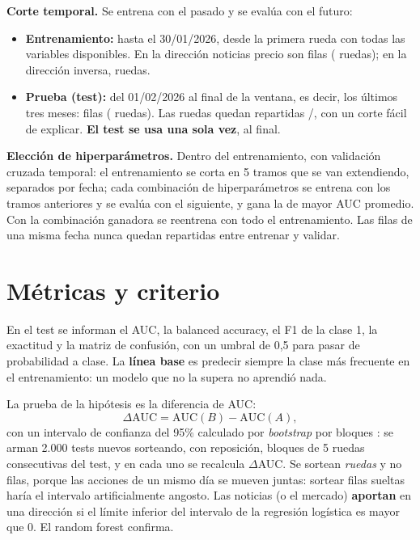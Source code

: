 \textbf{Corte temporal.} Se entrena con el pasado y se evalúa con el futuro:
\begin{itemize}
  \item \textbf{Entrenamiento:} hasta el 30/01/2026, desde la primera rueda con todas las
        variables disponibles. En la dirección noticias \flecha{} precio son
         filas ( ruedas); en la
        dirección inversa,  ruedas.
  \item \textbf{Prueba (test):} del 01/02/2026 al final de la ventana, es decir, los últimos tres
        meses:  filas ( ruedas). Las ruedas quedan
        repartidas /, con un corte
        fácil de explicar. \textbf{El test se usa una sola vez}, al final.
\end{itemize}

\textbf{Elección de hiperparámetros.} Dentro del entrenamiento, con validación cruzada temporal: el
entrenamiento se corta en 5 tramos que se van extendiendo, separados por fecha; cada combinación de
hiperparámetros se entrena con los tramos anteriores y se evalúa con el siguiente, y gana la de mayor
AUC promedio. Con la combinación ganadora se reentrena con todo el entrenamiento. Las filas de una
misma fecha nunca quedan repartidas entre entrenar y validar.

\section{Métricas y criterio}
\label{sec:criterio}

En el test se informan el AUC, la balanced accuracy, el F1 de la clase 1, la exactitud y la matriz
de confusión, con un umbral de 0,5 para pasar de probabilidad a clase. La \textbf{línea base} es
predecir siempre la clase más frecuente en el entrenamiento: un modelo que no la supera no aprendió
nada.

La prueba de la hipótesis es la diferencia de AUC:
\begin{equation}
\Delta\text{AUC} = \text{AUC}(B) - \text{AUC}(A),
\end{equation}
con un intervalo de confianza del 95\% calculado por \textit{bootstrap} por bloques
\citep{kunsch1989}: se arman 2.000 tests nuevos sorteando, con reposición, bloques de 5 ruedas
consecutivas del test, y en cada uno se recalcula $\Delta$AUC. Se sortean \textit{ruedas} y no
filas, porque las acciones de un mismo día se mueven juntas: sortear filas sueltas haría el
intervalo artificialmente angosto. Las noticias (o el mercado) \textbf{aportan} en una dirección si
el límite inferior del intervalo de la regresión logística es mayor que 0. El random forest
confirma.
